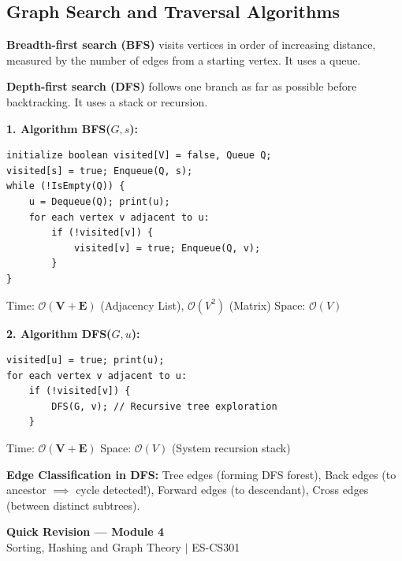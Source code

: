 \documentclass[12pt,a4paper]{article}
\begin{document}
\subsection{Graph Search and Traversal Algorithms}
\begin{tcolorbox}[defbox, title={Breadth-First and Depth-First Search}]
\textbf{Breadth-first search (BFS)} visits vertices in order of increasing distance, measured by the number of edges from a starting vertex. It uses a queue.

\textbf{Depth-first search (DFS)} follows one branch as far as possible before backtracking. It uses a stack or recursion.
\end{tcolorbox}

\begin{tcolorbox}[formulabox, title={\textbf{Breadth-First Search (BFS) and Depth-First Search (DFS) Algorithms}}]
\textbf{1. Algorithm BFS($G, s$):}
\begin{verbatim}
initialize boolean visited[V] = false, Queue Q;
visited[s] = true; Enqueue(Q, s);
while (!IsEmpty(Q)) {
    u = Dequeue(Q); print(u);
    for each vertex v adjacent to u:
        if (!visited[v]) {
            visited[v] = true; Enqueue(Q, v);
        }
}
\end{verbatim}
Time: $\mathbf{\mathcal{O}(V + E)}$ (Adjacency List), $\mathcal{O}(V^2)$ (Matrix) \quad Space: $\mathcal{O}(V)$
\par\vspace{3pt}\noindent
\textbf{2. Algorithm DFS($G, u$):}
\begin{verbatim}
visited[u] = true; print(u);
for each vertex v adjacent to u:
    if (!visited[v]) {
        DFS(G, v); // Recursive tree exploration
    }
\end{verbatim}
Time: $\mathbf{\mathcal{O}(V + E)}$ \quad Space: $\mathcal{O}(V)$ (System recursion stack)
\par\vspace{2pt}\noindent
\textbf{Edge Classification in DFS:} Tree edges (forming DFS forest), Back edges (to ancestor $\implies$ cycle detected!), Forward edges (to descendant), Cross edges (between distinct subtrees).
\end{tcolorbox}

\newpage
\begin{center}
  {\large\bfseries\color{myred} Quick Revision --- Module 4}\\[3pt]
  {\small\color{mydark} Sorting, Hashing and Graph Theory $|$ ES-CS301}
\end{center}
\noindent{\color{myred}\rule{\linewidth}{1.2pt}}
\vspace{4pt}
\end{document}
